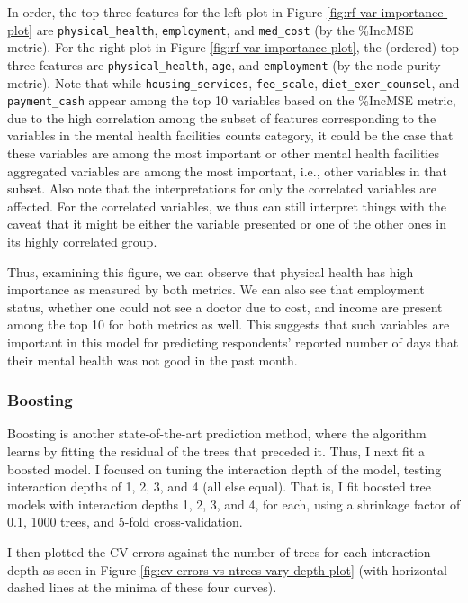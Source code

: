 \documentclass[
]{article}
\begin{document}
In order, the top three features for the left plot in Figure \ref{fig:rf-var-importance-plot} are \texttt{physical\_health}, \texttt{employment}, and \texttt{med\_cost} (by the \%IncMSE metric). For the right plot in Figure \ref{fig:rf-var-importance-plot}, the (ordered) top three features are \texttt{physical\_health}, \texttt{age}, and \texttt{employment} (by the node purity metric). Note that while \texttt{housing\_services}, \texttt{fee\_scale}, \texttt{diet\_exer\_counsel}, and \texttt{payment\_cash} appear among the top 10 variables based on the \%IncMSE metric, due to the high correlation among the subset of features corresponding to the variables in the mental health facilities counts category, it could be the case that these variables are among the most important or other mental health facilities aggregated variables are among the most important, i.e., other variables in that subset. Also note that the interpretations for only the correlated variables are affected. For the correlated variables, we thus can still interpret things with the caveat that it might be either the variable presented or one of the other ones in its highly correlated group.

Thus, examining this figure, we can observe that physical health has high importance as measured by both metrics. We can also see that employment status, whether one could not see a doctor due to cost, and income are present among the top 10 for both metrics as well. This suggests that such variables are important in this model for predicting respondents' reported number of days that their mental health was not good in the past month.

\hypertarget{boosting}{%
\subsubsection{Boosting}\label{boosting}}

Boosting is another state-of-the-art prediction method, where the algorithm learns by fitting the residual of the trees that preceded it. Thus, I next fit a boosted model. I focused on tuning the interaction depth of the model, testing interaction depths of 1, 2, 3, and 4 (all else equal). That is, I fit boosted tree models with interaction depths 1, 2, 3, and 4, for each, using a shrinkage factor of 0.1, 1000 trees, and 5-fold cross-validation.

I then plotted the CV errors against the number of trees for each interaction depth as seen in Figure \ref{fig:cv-errors-vs-ntrees-vary-depth-plot} (with horizontal dashed lines at the minima of these four curves).
\end{document}
